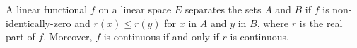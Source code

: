 A linear functional $f$ on a linear space $E$ separates the sets $A$ and $B$ if $f$ is non-identically-zero and $r(x) \leq r(y)$ for $x$ in $A$ and $y$ in $B$, where $r$ is the real part of $f$. Moreover, $f$ is continuous if and only if $r$ is continuous.
